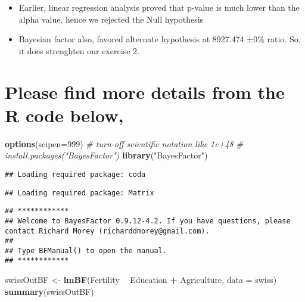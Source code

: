 \documentclass[]{article}
\newenvironment{Shaded}{\begin{snugshade}}{\end{snugshade}}
\newcommand{\CommentTok}[1]{\textcolor[rgb]{0.56,0.35,0.01}{\textit{#1}}}
\newcommand{\DataTypeTok}[1]{\textcolor[rgb]{0.13,0.29,0.53}{#1}}
\newcommand{\DecValTok}[1]{\textcolor[rgb]{0.00,0.00,0.81}{#1}}
\newcommand{\KeywordTok}[1]{\textcolor[rgb]{0.13,0.29,0.53}{\textbf{#1}}}
\newcommand{\NormalTok}[1]{#1}
\newcommand{\OperatorTok}[1]{\textcolor[rgb]{0.81,0.36,0.00}{\textbf{#1}}}
\newcommand{\StringTok}[1]{\textcolor[rgb]{0.31,0.60,0.02}{#1}}
\providecommand{\tightlist}{%
  \setlength{\itemsep}{0pt}\setlength{\parskip}{0pt}}
\begin{document}
\begin{itemize}
\begin{itemize}
    \begin{itemize}
    \tightlist
    \item
      Earlier, linear regression analysis proved that p-value is much
      lower than the alpha value, hence we rejected the Null hypothesis
    \item
      Bayesian factor also, favored alternate hypothesis at 8927.474
      ±0\% ratio. So, it does strenghten our exercise 2.
    \end{itemize}
  \end{itemize}
\end{itemize}

\hypertarget{please-find-more-details-from-the-r-code-below-3}{%
\section{Please find more details from the R code
below,}\label{please-find-more-details-from-the-r-code-below-3}}

\begin{Shaded}
\begin{Highlighting}[]
\KeywordTok{options}\NormalTok{(}\DataTypeTok{scipen=}\DecValTok{999}\NormalTok{)  }\CommentTok{# turn-off scientific notation like 1e+48}
\CommentTok{# install.packages("BayesFactor")}
\KeywordTok{library}\NormalTok{(}\StringTok{"BayesFactor"}\NormalTok{)}
\end{Highlighting}
\end{Shaded}

\begin{verbatim}
## Loading required package: coda
\end{verbatim}

\begin{verbatim}
## Loading required package: Matrix
\end{verbatim}

\begin{verbatim}
## ************
## Welcome to BayesFactor 0.9.12-4.2. If you have questions, please contact Richard Morey (richarddmorey@gmail.com).
## 
## Type BFManual() to open the manual.
## ************
\end{verbatim}

\begin{Shaded}
\begin{Highlighting}[]
\NormalTok{swissOutBF <-}\StringTok{ }\KeywordTok{lmBF}\NormalTok{(Fertility }\OperatorTok{~}\StringTok{ }\NormalTok{Education }\OperatorTok{+}\StringTok{ }\NormalTok{Agriculture, }\DataTypeTok{data =}\NormalTok{ swiss)}
\KeywordTok{summary}\NormalTok{(swissOutBF)}
\end{Highlighting}
\end{Shaded}
\end{document}
